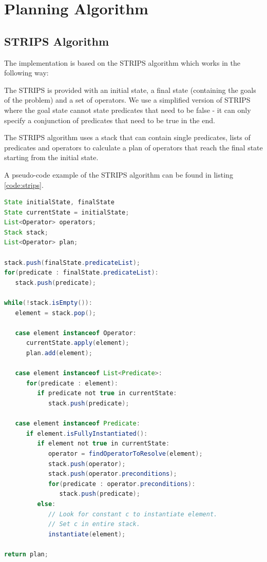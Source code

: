 \section{Planning Algorithm}
\label{sec:PlaniAlg}


\subsection{STRIPS Algorithm}
The implementation is based on the STRIPS algorithm which works in the following way:

The STRIPS is provided with an initial state, a final state (containing the goals of the problem) and a set of operators. We use a simplified version of STRIPS where the goal state cannot state predicates that need to be false - it can only specify a conjunction of predicates that need to be true in the end.

The STRIPS algorithm uses a stack that can contain single predicates, lists of predicates and operators to calculate a plan of operators that reach the final state starting from the initial state. 

A pseudo-code example of the STRIPS algorithm can be found in listing \ref{code:strips}.

\begin{lstlisting}[language=Java, 
	caption=The STRIPS algorithm, 
	keywordstyle=\color{blue},
	stringstyle=\color{red},
	commentstyle=\color{magenta},
	label = {code:strips}]
State initialState, finalState
State currentState = initialState;
List<Operator> operators;
Stack stack;
List<Operator> plan;

stack.push(finalState.predicateList);
for(predicate : finalState.predicateList):
   stack.push(predicate);

while(!stack.isEmpty()):
   element = stack.pop();
   
   case element instanceof Operator:
      currentState.apply(element);
      plan.add(element);
   
   case element instanceof List<Predicate>:
      for(predicate : element):
         if predicate not true in currentState:
            stack.push(predicate);
   
   case element instanceof Predicate:
      if element.isFullyInstantiated():
         if element not true in currentState:
            operator = findOperatorToResolve(element);
            stack.push(operator);
            stack.push(operator.preconditions);
            for(predicate : operator.preconditions):
               stack.push(predicate);
         else: 
            // Look for constant c to instantiate element.
            // Set c in entire stack.
            instantiate(element);

return plan;
\end{lstlisting}

